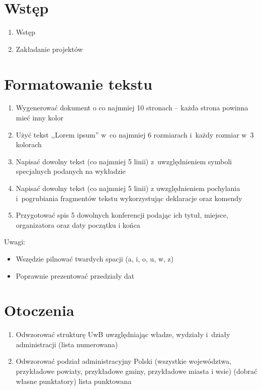\documentclass[a4paper,12pt]{article}
\begin{document}
\section{Wstęp}

\begin{enumerate}
    \item Wstęp
    \item Zakładanie projektów
\end{enumerate}

\section{Formatowanie tekstu}

\begin{enumerate}
    \item Wygenerować dokument o co najmniej 10 stronach -- każda strona powinna mieć inny kolor
    \item Użyć tekst ,,Lorem ipsum'' w~co najmniej 6 rozmiarach i~każdy rozmiar w~3 kolorach
    \item Napisać dowolny tekst (co najmniej 5 linii) z~uwzględnieniem symboli specjalnych podanych na wykładzie
    \item Napisać dowolny tekst (co najmniej 5 linii) z uwzględnieniem pochylania i~pogrubiania fragmentów tekstu wykorzystując deklaracje oraz komendy
    \item Przygotować spis 5 dowolnych konferencji podając ich tytuł, miejsce, organizatora  oraz daty początku i końca
\end{enumerate}

Uwagi:

\begin{itemize}
    \item Wszędzie pilnować twardych spacji (a, i, o, u, w, z)
    \item Poprawnie prezentować przedziały dat
\end{itemize}

\section{Otoczenia}

\begin{enumerate}
    \item Odwzorować strukturę UwB uwzględniając władze, wydziały i~działy administracji (lista numerowana)
    \item Odwzorować podział administracyjny Polski (wszystkie województwa, przykładowe powiaty, przykładowe gminy, przykładowe miasta i wsie) (dobrać własne punktatory) {lista punktowana}
\end{enumerate}
\end{document}

